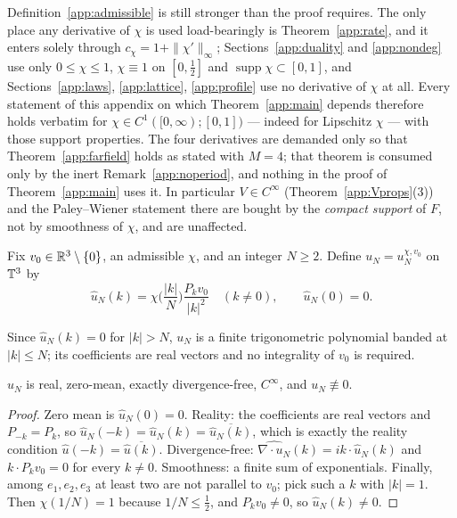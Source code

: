 \begin{remark}\label{app:c1}
Definition~\ref{app:admissible} is still stronger than the proof
requires. The only place any derivative of $\chi$ is used
load-bearingly is Theorem~\ref{app:rate}, and it enters solely through
$c_\chi=1+\|\chi'\|_\infty$; Sections~\ref{app:duality} and
\ref{app:nondeg} use only $0\le\chi\le1$, $\chi\equiv1$ on
$[0,\tfrac12]$ and $\operatorname{supp}\chi\subset[0,1]$, and
Sections~\ref{app:laws}, \ref{app:lattice}, \ref{app:profile} use no
derivative of $\chi$ at all. Every statement of this appendix on which
Theorem~\ref{app:main} depends therefore holds verbatim for
$\chi\in C^1([0,\infty);[0,1])$ --- indeed for Lipschitz $\chi$ ---
with those support properties. The four derivatives are demanded only
so that Theorem~\ref{app:farfield} holds as stated with $M=4$; that
theorem is consumed only by the inert Remark~\ref{app:noperiod}, and
nothing in the proof of Theorem~\ref{app:main} uses it. In particular
$V\in C^\infty$ (Theorem~\ref{app:Vprops}(3)) and the Paley--Wiener
statement there are bought by the \emph{compact support} of $F$, not by
smoothness of $\chi$, and are unaffected.
\end{remark}

\begin{definition}\label{app:family}
Fix $v_0\in\mathbb R^3\setminus\{0\}$, an admissible $\chi$, and an integer
$N\ge2$. Define $u_N=u_N^{\chi,v_0}$ on $\mathbb T^3$ by
\begin{equation}\label{app:famdef}
\hat u_N(k)=\chi\Big(\frac{|k|}{N}\Big)\frac{P_kv_0}{|k|^{2}}
\quad(k\neq0),\qquad \hat u_N(0)=0 .
\end{equation}
\end{definition}

Since $\hat u_N(k)=0$ for $|k|>N$, $u_N$ is a finite trigonometric
polynomial banded at $|k|\le N$; its coefficients are real vectors and
no integrality of $v_0$ is required.

\begin{lemma}\label{app:structure}
$u_N$ is real, zero-mean, exactly divergence-free, $C^\infty$, and
$u_N\not\equiv0$.
\end{lemma}

\begin{proof}
Zero mean is $\hat u_N(0)=0$. Reality: the coefficients are real
vectors and $P_{-k}=P_k$, so
$\hat u_N(-k)=\hat u_N(k)=\overline{\hat u_N(k)}$, which is exactly the
reality condition $\hat u(-k)=\overline{\hat u(k)}$. Divergence-free:
$\widehat{\nabla\cdot u_N}(k)=ik\cdot\hat u_N(k)$ and $k\cdot P_kv_0=0$
for every $k\neq0$. Smoothness: a finite sum of exponentials. Finally,
among $e_1,e_2,e_3$ at least two are not parallel to $v_0$; pick such a
$k$ with $|k|=1$. Then $\chi(1/N)=1$ because $1/N\le\tfrac12$, and
$P_kv_0\neq0$, so $\hat u_N(k)\neq0$.
\end{proof}

